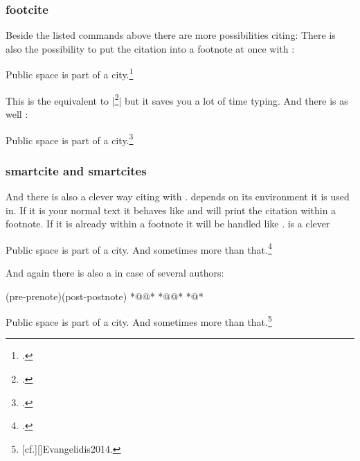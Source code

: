 \documentclass[a4paper,
10pt,
greek,
french,
spanish,
italian,
ngerman,
english,
]{ltxdoc}
\begin{document}
\subsubsection{footcite}
 \DescribeMacro{\footcite}
 Beside the listed  commands above there are more possibilities citing:
 There is also the possibility to put the citation into a footnote at once with :
\begin{example}
Public space is part of a city.\footcite{Osland2016}
\end{example}
This is the equivalent to |\footnote{\cite{Osland2016}.}| but it saves you a lot of time typing.
 \DescribeMacro{\footcites} And there is as well :
\begin{example}
Public space is part of a city.\footcites(cf.)(){Osland2016}{Evangelidis2014}
\end{example}
 
 \subsubsection{smartcite and smartcites}

\DescribeMacro{\smartcite}
And there is also a clever way citing with .
 depends on its environment it is used in. If it is your normal text it behaves like  and will print the citation within a footnote.
If it is already within a footnote it will be handled like . 
 is a clever 

\begin{example}
Public space is part of a city.\smartcite{Osland2016} 
And sometimes more than that.\footnote{\smartcite[cf.][]{Evangelidis2014}.}
\end{example}


\DescribeMacro{\smartcites}
And again there is also a  in case of several authors: 
\begin{code}
\smartcites(pre-prenote)(post-postnote)%
  *@@*%
  *@@*%
  *@\ldots@*
\end{code}
\begin{example}
Public space is part of a city. 
And sometimes more than that.\footnote{[cf.][]{Evangelidis2014}.}
\end{example}
\end{document}
